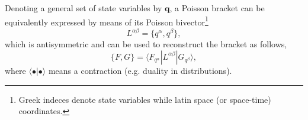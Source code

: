 \documentclass[
10pt, %
a4paper, %
oneside, %
headinclude,footinclude, %
BCOR5mm, %
]{scrartcl}
\newcommand{\qq}{\mathbf{q}}
\newcommand{\VK}[1]{{\color{Cyan}VK:\ \ #1}}
\newcommand{\Ffunc}{F}
\newcommand{\Gfunc}{G}
\begin{document}
Denoting a general set of state variables by $\qq$, a Poisson bracket can be equivalently expressed by means of its Poisson bivector\footnote{Greek indeces denote state variables while latin space (or space-time) coordinates.}
\begin{equation}\label{bivector}
	L^{\alpha \beta} = \{q^\alpha,q^\beta\},
\end{equation}
which is antisymmetric and can be used to reconstruct the bracket as follows,
\begin{equation}
	\{\Ffunc,\Gfunc\} = \langle \Ffunc_{q^\alpha}| L^{\alpha\beta}| \Gfunc_{q^\beta}\rangle,
\end{equation}
where $\langle\bullet|\bullet\rangle$ means a contraction (e.g. duality in distributions).
\end{document}
